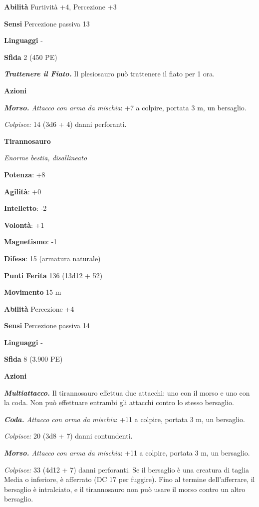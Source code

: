 \begin{multicols}{2}
\textbf{Abilità} Furtività +4, Percezione +3

\textbf{Sensi} Percezione passiva 13

\textbf{Linguaggi} -

\textbf{Sfida} 2 (450 PE)

\emph{\textbf{Trattenere il Fiato.}} Il plesiosauro può trattenere il
fiato per 1 ora.

\textbf{Azioni}

\emph{\textbf{Morso.} Attacco con arma da mischia}: +7 a colpire,
portata 3 m, un bersaglio.

\emph{Colpisce:} 14 (3d6 + 4) danni perforanti.

\textbf{Tirannosauro}

\emph{Enorme bestia, disallineato}

\textbf{Potenza}: +8

\textbf{Agilità}: +0

\textbf{Intelletto}: -2

\textbf{Volontà}: +1

\textbf{Magnetismo}: -1

\textbf{Difesa}: 15 (armatura naturale)

\textbf{Punti Ferita} 136 (13d12 + 52)

\textbf{Movimento} 15 m

\textbf{Abilità} Percezione +4

\textbf{Sensi} Percezione passiva 14

\textbf{Linguaggi} -

\textbf{Sfida} 8 (3.900 PE)

\textbf{Azioni}

\emph{\textbf{Multiattacco.}} Il tirannosauro effettua due attacchi: uno
con il morso e uno con la coda. Non può effettuare entrambi gli attacchi
contro lo stesso bersaglio.

\emph{\textbf{Coda.} Attacco con arma da mischia}: +11 a colpire,
portata 3 m, un bersaglio.

\emph{Colpisce:} 20 (3d8 + 7) danni contundenti.

\emph{\textbf{Morso.} Attacco con arma da mischia}: +11 a colpire,
portata 3 m, un bersaglio.

\emph{Colpisce:} 33 (4d12 + 7) danni perforanti. Se il bersaglio è una
creatura di taglia Media o inferiore, è afferrato (DC 17 per fuggire).
Fino al termine dell'afferrare, il bersaglio è intralciato, e il
tirannosauro non può usare il morso contro un altro bersaglio.


\end{multicols}
